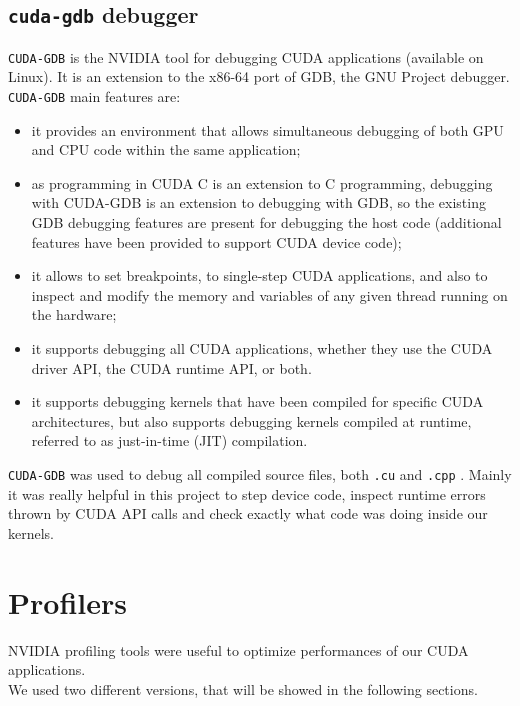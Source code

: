 	\subsection{\texttt{cuda-gdb} debugger}
	\texttt{CUDA-GDB} is the NVIDIA tool for debugging CUDA applications (available on Linux). It is an extension to the x86-64 port of GDB, the GNU Project debugger.\\
	\texttt{CUDA-GDB} main features are:
	\begin{itemize}
		\item it provides an environment that allows simultaneous debugging of both GPU and CPU code within the same application;
		
		\item as programming in CUDA C is an extension to C programming, debugging with CUDA-GDB is an extension to debugging with GDB, so the existing GDB debugging features are present for debugging the host code (additional features have been provided to support  CUDA device code);	
		
		\item it allows to set breakpoints, to single-step CUDA applications, and also to inspect and modify the memory and variables of any given thread running on the hardware;
		
		\item it supports debugging all CUDA applications, whether they use the CUDA driver API, the CUDA runtime API, or both.
		
		\item it supports debugging kernels that have been compiled for specific CUDA architectures, but also supports debugging kernels compiled at runtime, referred to as just-in-time (JIT) compilation.
	\end{itemize}	
	\texttt{CUDA-GDB} was used to debug all compiled source files, both \texttt{.cu} and \texttt{.cpp} .
	Mainly it was really helpful in this project to step device code, inspect runtime errors thrown by CUDA API calls and check exactly what code was doing inside our kernels.





\section{Profilers}	
	NVIDIA profiling tools were useful to optimize performances of our CUDA applications.\\
	We used two different versions, that will be showed in the following sections.
		

